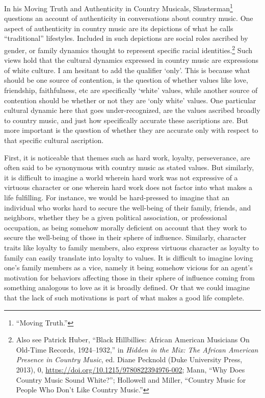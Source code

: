 \documentclass[phdthesis,12pt,final,a4paper]{wuthesis}
\theoremstyle{definition}
\theoremstyle{definition}
\theoremstyle{definition}
\theoremstyle{definition}
\theoremstyle{remark}
\begin{document}
In his Moving Truth and Authenticity in Country Musicals, Shusterman\footnote{{``Moving {Truth}.''}} questions an account of authenticity in conversations about country music. One aspect of authenticity in country music are its depictions of what he calls ``traditional'' lifestyles. Included in such depictions are social roles ascribed by gender, or family dynamics thought to represent specific racial identities.\footnote{Also see Patrick Huber, {``Black {Hillbillies}: {African American Musicians On Old-Time Records}, 1924--1932,''} in \emph{Hidden in the {Mix}: {The African American Presence} in {Country Music}}, ed. Diane Pecknold (Duke University Press, 2013), 0, \url{https://doi.org/10.1215/9780822394976-002}; Mann, {``Why Does Country Music Sound White?''}; Hollowell and Miller, {``Country {Music} for {People Who Don}'t {Like Country Music}.''}} Such views hold that the cultural dynamics expressed in country music are expressions of white culture. I am hesitant to add the qualifier `only'. This is because what should be one source of contention, is the question of whether values like love, friendship, faithfulness, etc are specifically `white' values, while another source of contention should be whether or not they are `only white' values. One particular cultural dynamic here that goes under-recognized, are the values ascribed broadly to country music, and just how specifically accurate these ascriptions are. But more important is the question of whether they are accurate only with respect to that specific cultural ascription.

First, it is noticeable that themes such as hard work, loyalty, perseverance, are often said to be synonymous with country music as stated values. But similarly, it is difficult to imagine a world wherein hard work was not expressive of a virtuous character or one wherein hard work does not factor into what makes a life fulfilling. For instance, we would be hard-pressed to imagine that an individual who works hard to secure the well-being of their family, friends, and neighbors, whether they be a given political association, or professional occupation, as being somehow morally deficient on account that they work to secure the well-being of those in their sphere of influence. Similarly, character traits like loyalty to family members, also express virtuous character as loyalty to family can easily translate into loyalty to values. It is difficult to imagine loving one's family members as a vice, namely it being somehow vicious for an agent's motivation for behaviors affecting those in their sphere of influence coming from something analogous to love as it is broadly defined. Or that we could imagine that the lack of such motivations is part of what makes a good life complete.
\end{document}
